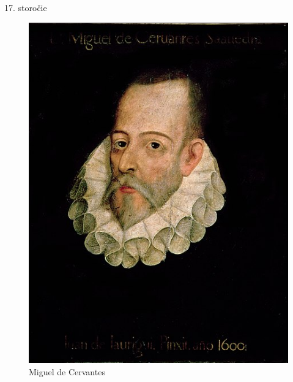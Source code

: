 \documentclass[dvipsnames]{beamer}
\begin{document}
\begin{frame}{17. storočie}
\begin{itemize}
\begin{minipage}[t]{0.6\textwidth}
		\begin{figure}
			\includegraphics[scale=0.1605]{cervo}
			\caption{Miguel de Cervantes}
		\end{figure}
		\end{minipage}
	\end{itemize}
\end{frame}
\end{document}
